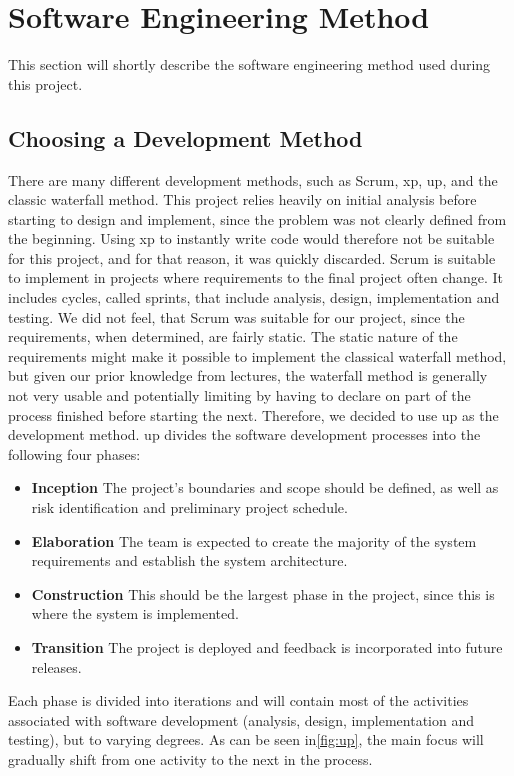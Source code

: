 \section{Software Engineering Method}
\label{sec:software_engineering_method}
This section will shortly describe the software engineering method used during this project.

\subsection{Choosing a Development Method}
There are many different development methods, such as Scrum, \ac{xp}, \ac{up}, and the classic waterfall method.
This project relies heavily on initial analysis before starting to design and implement, since the problem was not clearly defined from the beginning.
Using \ac{xp} to instantly write code would therefore not be suitable for this project, and for that reason, it was quickly discarded.
Scrum is suitable to implement in projects where requirements to the final project often change.
It includes cycles, called sprints, that include analysis, design, implementation and testing.
We did not feel, that Scrum was suitable for our project, since the requirements, when determined, are fairly static.
The static nature of the requirements might make it possible to implement the classical waterfall method, but given our prior knowledge from lectures, the waterfall method is generally not very usable and potentially limiting by having to declare on part of the process finished before starting the next.
Therefore, we decided to use \ac{up} as the development method.
\ac{up} divides the software development processes into the following four phases: 

\begin{itemize}
\item \textbf{Inception} The project's boundaries and scope should be defined, as well as risk identification and preliminary project schedule.
\item \textbf{Elaboration} The team is expected to create the majority of the system requirements and establish the system architecture.
\item \textbf{Construction} This should be the largest phase in the project, since this is where the system is implemented.
\item \textbf{Transition} The project is deployed and feedback is incorporated into future releases.
\end{itemize}

Each phase is divided into iterations and will contain most of the activities associated with software development (analysis, design, implementation and testing), but to varying degrees. As can be seen in\autoref{fig:up}, the main focus will gradually shift from one activity to the next in the process.

